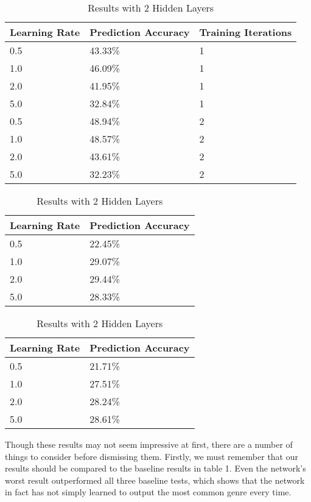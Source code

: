 \documentclass[11pt,letterpaper]{article}
\begin{document}
\begin{table}[ht]
\centering
\caption{Results with 0 Hidden Layers}
\label{my-label}
\begin{tabular}{|l|l|l|}
\hline
Learning Rate & Prediction Accuracy & Training Iterations \\ \hline
0.5           & 43.33\%             & 1                   \\
1.0           & 46.09\%             & 1                   \\
2.0           & 41.95\%             & 1                   \\
5.0           & 32.84\%             & 1                   \\
\hline
0.5           & 48.94\%             & 2                   \\
1.0           & 48.57\%             & 2                   \\
2.0           & 43.61\%             & 2                   \\
5.0           & 32.23\%             & 2                  \\
\hline
\end{tabular}

\centering
\caption{Results with 1 Hidden Layer}
\begin{tabular}{|l|l|}
\hline
Learning Rate & Prediction Accuracy \\ \hline
0.5           & 22.45\%             \\
1.0           & 29.07\%             \\
2.0           & 29.44\%             \\
5.0           & 28.33\%            \\
\hline
\end{tabular}

\centering
\caption{Results with 2 Hidden Layers}
\begin{tabular}{|l|l|}
\hline
Learning Rate & Prediction Accuracy \\ \hline
0.5           & 21.71\%             \\
1.0           & 27.51\%             \\
2.0           & 28.24\%             \\
5.0           & 28.61\%            \\
\hline
\end{tabular}
\end{table}

Though these results may not seem impressive at first, there are a number of things to consider before dismissing them. Firstly, we must remember that our results should be compared to the baseline results in table 1. Even the network's worst result outperformed all three baseline tests, which shows that the network in fact has not simply learned to output the most common genre every time.
\end{document}
